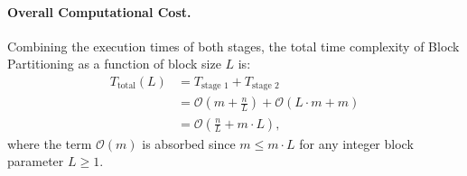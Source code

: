 \paragraph{Overall Computational Cost.}
Combining the execution times of both stages, the total time complexity of Block Partitioning as a function of block size $L$ is:
\begin{align}
  T_{\text{total}}(L) &= T_{\text{stage 1}} + T_{\text{stage 2}} \nonumber \\
  &= \mathcal{O}\left(m + \frac{n}{L}\right) + \mathcal{O}(L \cdot m + m) \nonumber \\
  &= \mathcal{O}\left(\frac{n}{L} + m \cdot L\right),
  \label{eq:block-cost-function-en}
\end{align}
where the term $\mathcal{O}(m)$ is absorbed since $m \le m \cdot L$ for any integer block parameter $L \ge 1$.

